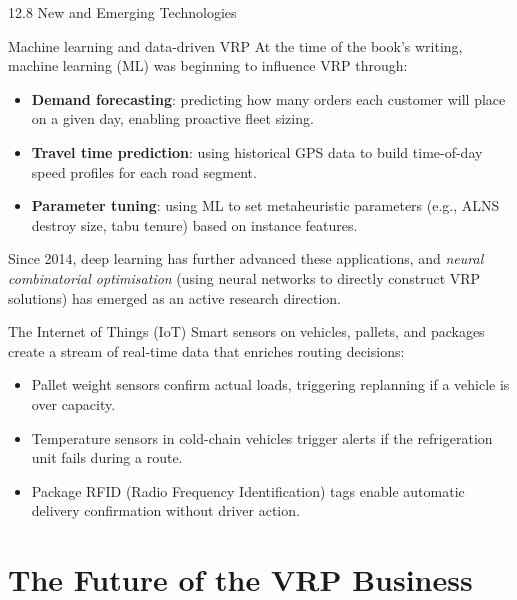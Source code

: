 \documentclass[aspectratio=169,10pt]{beamer}
\begin{document}
\begin{frame}[allowframebreaks]{12.8 \; New and Emerging Technologies}
  \begin{block}{Machine learning and data-driven VRP}
    At the time of the book's writing, machine learning (ML) was beginning
    to influence VRP through:
    \begin{itemize}
      \item \textbf{Demand forecasting}: predicting how many orders each
            customer will place on a given day, enabling proactive fleet
            sizing.
      \item \textbf{Travel time prediction}: using historical GPS data to
            build time-of-day speed profiles for each road segment.
      \item \textbf{Parameter tuning}: using ML to set metaheuristic
            parameters (e.g., ALNS destroy size, tabu tenure) based on
            instance features.
    \end{itemize}
    Since 2014, deep learning has further advanced these applications,
    and \emph{neural combinatorial optimisation} (using neural networks
    to directly construct VRP solutions) has emerged as an active
    research direction.
  \end{block}

  \begin{block}{The Internet of Things (IoT)}
    Smart sensors on vehicles, pallets, and packages create a stream of
    real-time data that enriches routing decisions:
    \begin{itemize}
      \item Pallet weight sensors confirm actual loads, triggering
            replanning if a vehicle is over capacity.
      \item Temperature sensors in cold-chain vehicles trigger alerts
            if the refrigeration unit fails during a route.
      \item Package RFID (Radio Frequency Identification) tags enable
            automatic delivery confirmation without driver action.
    \end{itemize}
  \end{block}
\end{frame}

\section{The Future of the VRP Business}
\end{document}
